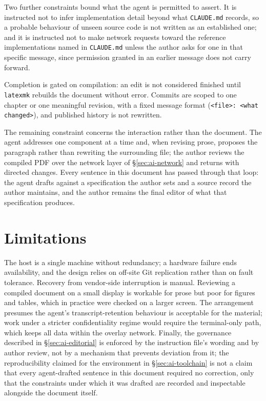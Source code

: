 Two further constraints bound what the agent is permitted to assert. It is instructed not to infer implementation detail beyond what \texttt{CLAUDE.md} records, so a probable behaviour of unseen source code is not written as an established one; and it is instructed not to make network requests toward the reference implementations named in \texttt{CLAUDE.md} unless the author asks for one in that specific message, since permission granted in an earlier message does not carry forward.

Completion is gated on compilation: an edit is not considered finished until \texttt{latexmk} rebuilds the document without error. Commits are scoped to one chapter or one meaningful revision, with a fixed message format (\texttt{<file>: <what changed>}), and published history is not rewritten.

The remaining constraint concerns the interaction rather than the document. The agent addresses one component at a time and, when revising prose, proposes the paragraph rather than rewriting the surrounding file; the author reviews the compiled PDF over the network layer of \S\ref{sec:ai-network} and returns with directed changes. Every sentence in this document has passed through that loop: the agent drafts against a specification the author sets and a source record the author maintains, and the author remains the final editor of what that specification produces.

\section{Limitations}
\label{sec:ai-limitations}

The host is a single machine without redundancy; a hardware failure ends availability, and the design relies on off-site Git replication rather than on fault tolerance. Recovery from vendor-side interruption is manual. Reviewing a compiled document on a small display is workable for prose but poor for figures and tables, which in practice were checked on a larger screen. The arrangement presumes the agent's transcript-retention behaviour is acceptable for the material; work under a stricter confidentiality regime would require the terminal-only path, which keeps all data within the overlay network. Finally, the governance described in \S\ref{sec:ai-editorial} is enforced by the instruction file's wording and by author review, not by a mechanism that prevents deviation from it; the reproducibility claimed for the environment in \S\ref{sec:ai-toolchain} is not a claim that every agent-drafted sentence in this document required no correction, only that the constraints under which it was drafted are recorded and inspectable alongside the document itself.
